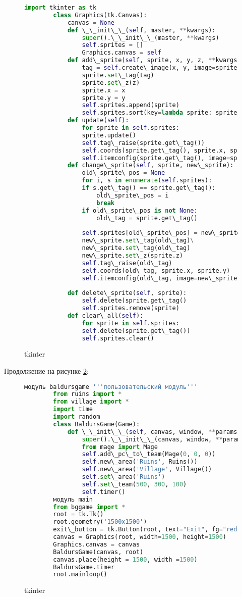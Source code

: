 \begin{figure}[H]
	\begin{lstlisting}[language=Python]
		import tkinter as tk
		class Graphics(tk.Canvas):
			canvas = None
			def \_\_init\_\_(self, master, **kwargs):
				super().\_\_init\_\_(master, **kwargs)
				self.sprites = []
				Graphics.canvas = self			
			def add\_sprite(self, sprite, x, y, z, **kwargs):
				tag = self.create\_image(x, y, image=sprite.image, anchor='center', **kwargs)
				sprite.set\_tag(tag)
				sprite.set\_z(z)
				sprite.x = x
				sprite.y = y
				self.sprites.append(sprite)
				self.sprites.sort(key=lambda sprite: sprite.z)
			def update(self):
				for sprite in self.sprites:
				sprite.update()
				self.tag\_raise(sprite.get\_tag())
				self.coords(sprite.get\_tag(), sprite.x, sprite.y)
				self.itemconfig(sprite.get\_tag(), image=sprite.image)
			def change\_sprite(self, sprite, new\_sprite):
				old\_sprite\_pos = None
				for i, s in enumerate(self.sprites):
				if s.get\_tag() == sprite.get\_tag():
					old\_sprite\_pos = i
					break
				if old\_sprite\_pos is not None:
					old\_tag = sprite.get\_tag()
					
				self.sprites[old\_sprite\_pos] = new\_sprite
				new\_sprite.set\_tag(old\_tag)\
				new\_sprite.set\_tag(old\_tag)
				new\_sprite.set\_z(sprite.z)
				self.tag\_raise(old\_tag)
				self.coords(old\_tag, sprite.x, sprite.y)
				self.itemconfig(old\_tag, image=new\_sprite.image)
			
			def delete\_sprite(self, sprite):
				self.delete(sprite.get\_tag()
				self.sprites.remove(sprite)
			def clear\_all(self):	
				for sprite in self.sprites:
				self.delete(sprite.get\_tag())
				self.sprites.clear()
	\end{lstlisting}  
	\caption{tkinter}
	\label{tkinter2:image}
\end{figure}


Продолжение на рисунке \ref{tkinter3:image}:
\begin{figure}[H]
	\begin{lstlisting}[language=Python]
		модуль baldursgame '''пользовательский модуль'''
		from ruins import *
		from village import *
		import time
		import random
		class BaldursGame(Game):
			def \_\_init\_\_(self, canvas, window, **params):
				super().\_\_init\_\_(canvas, window, **params)
				from mage import Mage
				self.add\_pc\_to\_team(Mage(0, 0, 0))
				self.new\_area('Ruins', Ruins())
				self.new\_area('Village', Village())
				self.set\_area('Ruins')
				self.set\_team(500, 300, 100)
				self.timer()
		модуль main
		from bggame import *
		root = tk.Tk()
		root.geometry('1500x1500')
		exit\_button = tk.Button(root, text="Exit", fg="red", command=root.destroy)
		canvas = Graphics(root, width=1500, height=1500)
		Graphics.canvas = canvas
		BaldursGame(canvas, root)
		canvas.place(height = 1500, width =1500)
		BaldursGame.timer
		root.mainloop()
	\end{lstlisting}  
	\caption{tkinter}
	\label{tkinter3:image}
\end{figure}

